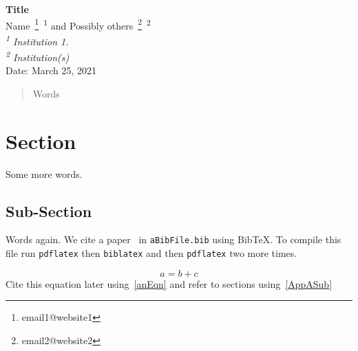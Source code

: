 %




\begin{center}
{\bf Title} \bsk\\
    Name~\footnote{email1@website1}~\textsuperscript{1} 
    and Possibly others~\footnote{email2@website2}~\textsuperscript{2}\\
{\em \textsuperscript{1} Institution 1.}\\
{\em \textsuperscript{2} Institution(s)}\\
Date: March 25, 2021
\end{center}

\begin{abstract}
Words
\end{abstract}

\section{Section}
\label{Label1}
\xb
{}
\xa

Some more words.

\subsection{Sub-Section}
\label{Label2}
\xb
{}
\xa

Words again. We cite a paper~\cite{AuthorYear} in {\tt aBibFile.bib} using
BibTeX. To compile this file run {\tt pdflatex} then {\tt biblatex} and
then {\tt pdflatex} two more times.

\begin{equation}
    a = b + c
    \label{anEqn}
\end{equation}
%
Cite this equation later using~\eqref{anEqn} and refer to sections
using~\ref{AppASub}






